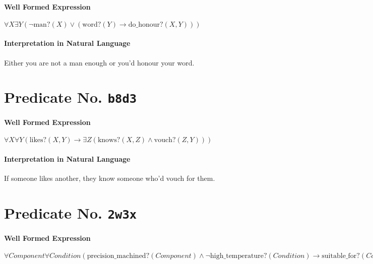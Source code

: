 \documentclass[11pt]{article}
\begin{document}
\paragraph*{Well Formed Expression}
\label{sec:org12fd61b}

\(\forall X \exists Y (\neg \text{man?}(X) \lor (\text{word?}(Y) \rightarrow \text{do\_honour?}(X, Y)))\)

\paragraph*{Interpretation in Natural Language}
\label{sec:org57049f2}

Either you are not a man enough or you’d honour your word.



\section{Predicate No. \texttt{b8d3}}
\label{sec:org15fff8a}

\paragraph*{Well Formed Expression}
\label{sec:org9f5f1cc}

\(\forall X \forall Y (\text{likes?}(X, Y) \rightarrow \exists Z (\text{knows?}(X, Z) \land \text{vouch?}(Z, Y)))\)

\paragraph*{Interpretation in Natural Language}
\label{sec:org061ad2e}

If someone likes another, they know someone who'd vouch for them.



\section{Predicate No. \texttt{2w3x}}
\label{sec:org42b83f4}

\paragraph*{Well Formed Expression}
\label{sec:orgd8942f5}

\(\forall \mathit{Component} \forall \mathit{Condition} (\mathrm{precision\_machined?}(\mathit{Component}) \land \neg \mathrm{high\_temperature?}(\mathit{Condition}) \rightarrow \mathrm{suitable\_for?}(\mathit{Component}, \mathit{Condition}))\)
\end{document}
